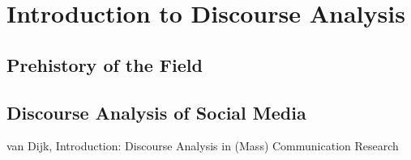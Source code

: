 \chapter{Introduction to Discourse Analysis}
\section{Prehistory of the Field}
\section{Discourse Analysis of Social Media}
van Dijk, Introduction: Discourse Analysis in (Mass) Communication
Research
